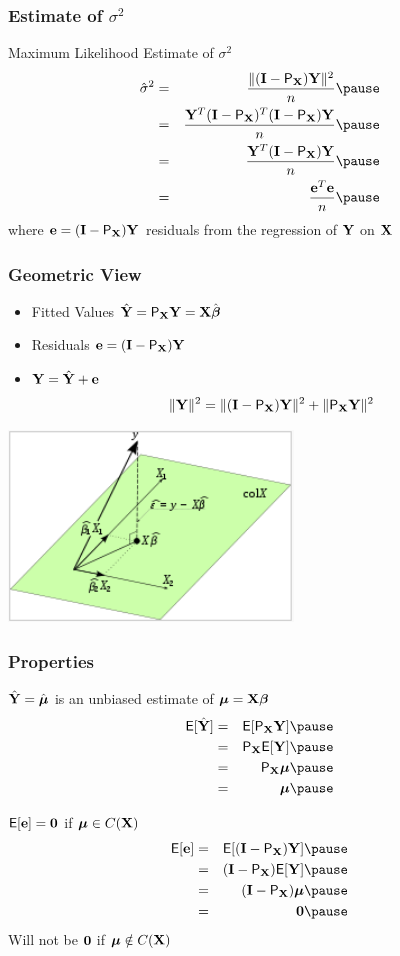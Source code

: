 \documentclass{beamer}
\begin{document}
\begin{frame}
  \frametitle{Estimate of $\sigma^2$}
  Maximum Likelihood Estimate of $\sigma^2$
  \begin{eqnarray*}
    \shat & = & \frac{\| (\I - \P_\X) \Y \|^2}{n} \pause\\
      & = & \frac{\Y^T(\I - \P_\X)^T(\I-\P_\X) \Y }{n} \pause\\
 & = & \frac{ \Y^T(\I - \P_\X) \Y}{n} \pause\\
 & = & \frac{\e^T\e} {n} \pause
  \end{eqnarray*}
where $\mathbf{e} = (\mathbf{I} - \textsf{P}_{\mathbf{X}})\mathbf{Y}$  \alert<5>{residuals} from the regression of $\mathbf{Y}$
on $\mathbf{X}$
\end{frame}
\begin{frame}
  \frametitle{Geometric View}
  \begin{itemize}
  \item Fitted Values  $\hat{\mathbf{Y}} = \textsf{P}_{\mathbf{X}} \mathbf{Y} = \mathbf{X} \hat{\boldsymbol{\beta}}$ \pause
\item Residuals $\mathbf{e} = (\mathbf{I} - \textsf{P}_{\mathbf{X}}) \mathbf{Y}$ \pause
\item $\mathbf{Y} = \hat{\mathbf{Y}} + \mathbf{e}$ \pause
$$\| \mathbf{Y} \|^2 = \| (\mathbf{I}- \textsf{P}_{\mathbf{X}})\mathbf{Y}\|^2 + \| \textsf{P}_{\mathbf{X}} \mathbf{Y} \|^2$$ \pause
  \end{itemize}
  \centerline{\includegraphics[height=2in]{OLS}}

\end{frame}

\begin{frame}
  \frametitle{Properties}
 $\hat{\mathbf{Y}} = \hat{\boldsymbol{\mu}}$ is an unbiased estimate of $\boldsymbol{\mu} = \mathbf{X}\boldsymbol{\beta}$
\pause
    \begin{eqnarray*}
      \E [ \Yhat ]  & = & \E [\P_\X \Y ] \pause\\
& = & \P_\X \E[\Y] \pause\\
& = & \P_\X \mub \pause\\
& = & \mub \pause
    \end{eqnarray*}

$\textsf{E}[\mathbf{e}] = \mathbf{0}$ if $\boldsymbol{\mu} \in C(\mathbf{X})$ \pause
\begin{eqnarray*}
      \E [ \e ]  & = & \E [(\I - \P_\X) \Y ] \pause\\
& = & (\I - \P_\X) \E[\Y] \pause\\
& = & (\I - \P_\X) \mub \pause\\
& = & \zero \pause
    \end{eqnarray*}
Will not be $\mathbf{0}$ if $\boldsymbol{\mu} \notin C(\mathbf{X})$

\end{frame}
\end{document}
